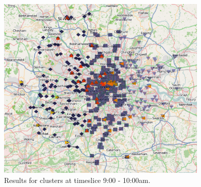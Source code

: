 \begin{figure}
\centering
\includegraphics[width=0.9\textwidth]{images/futurework/map_london.jpg}
\caption{Results for clusters at timeslice 9:00 - 10:00am.}
\label{fig:clusters}
\end{figure}
